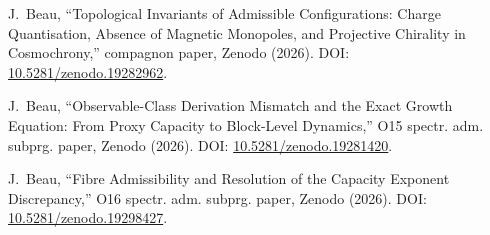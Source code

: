 J.~Beau,
``Topological Invariants of Admissible Configurations: Charge Quantisation, Absence of Magnetic Monopoles, and Projective Chirality in Cosmochrony,''
compagnon paper, Zenodo (2026).
DOI: \href{https://doi.org/10.5281/zenodo.19282962}{10.5281/zenodo.19282962}.

J.~Beau,
``Observable-Class Derivation Mismatch and the Exact Growth Equation: From Proxy Capacity to Block-Level Dynamics,''
O15 spectr. adm. subprg. paper, Zenodo (2026).
DOI: \href{https://doi.org/10.5281/zenodo.19281420}{10.5281/zenodo.19281420}.

J.~Beau,
``Fibre Admissibility and Resolution of the Capacity Exponent Discrepancy,''
O16 spectr. adm. subprg. paper, Zenodo (2026).
DOI: \href{https://doi.org/10.5281/zenodo.19298427}{10.5281/zenodo.19298427}.
